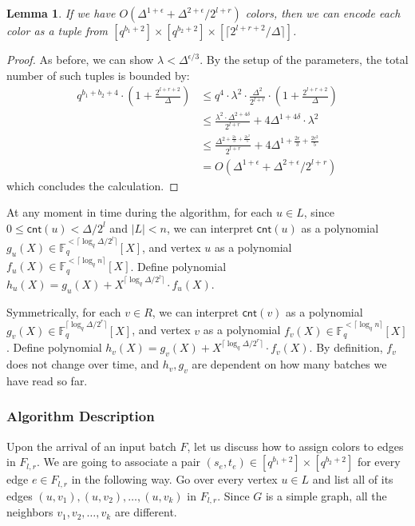 \documentclass[11pt,a4paper]{article}
\newtheorem{lemma}{Lemma}[section]
\newcommand{\ceil}[1]{\lceil #1 \rceil}
\newcommand{\cnt}{\mathsf{cnt}}
\newcommand{\brac}[1]{\left(#1\right)}
\newcommand{\field}{\mathbb{F}}
\begin{document}
\begin{lemma}
If we have $O\brac{\Delta^{1+\epsilon} + \Delta^{2+\epsilon} / 2^{l+r}}$ colors, then we can encode each color as a tuple from $[q^{b_1+2}]\times [q^{b_2+2}]\times [\ceil{2^{l+r+2} / \Delta}]$.
\end{lemma}
\begin{proof}
    As before, we can show $\lambda < \Delta^{\epsilon/3}$. By the setup of the parameters, the total number of such tuples is bounded by:
    $$\begin{aligned}
        q^{b_1+b_2+4}\cdot \brac{1 + \frac{2^{l+r+2}}{\Delta}}&\leq q^4\cdot \lambda^2\cdot \frac{\Delta^2}{2^{l+r}}\cdot \brac{1 + \frac{2^{l+r+2}}{\Delta}}\\
        &\leq \frac{\lambda^2\cdot\Delta^{2+4\delta}}{2^{l+r}} + 4\Delta^{1+4\delta}\cdot \lambda^2\\
        &\leq \frac{\Delta^{2 + \frac{2\epsilon}{3} + \frac{2\epsilon^2}{5}}}{2^{l+r}} + 4\Delta^{1 +  \frac{2\epsilon}{3} + \frac{2\epsilon^2}{5}}\\
        &= O(\Delta^{1+\epsilon} + \Delta^{2+\epsilon} / 2^{l+r})
    \end{aligned}$$
    which concludes the calculation.
\end{proof}

At any moment in time during the algorithm, for each $u\in L$, since $0\leq \cnt(u) < \Delta / 2^l$ and $|L| < n$, we can interpret $\cnt(u)$ as a polynomial $g_u(X)\in \field_q^{<\ceil{\log_q \Delta / 2^l}}[X]$, and vertex $u$ as a polynomial $f_u(X)\in \field_q^{<\ceil{\log_q n}}[X]$. Define polynomial $h_u(X) = g_u(X) + X^{\ceil{\log_q \Delta / 2^l}}\cdot f_u(X)$.

Symmetrically, for each $v\in R$, we can interpret $\cnt(v)$ as a polynomial $g_v(X)\in \field_q^{\ceil{\log_q \Delta / 2^r}}[X]$, and vertex $v$ as a polynomial $f_v(X)\in \field_q^{<\ceil{\log_q n}}[X]$. Define polynomial $h_v(X) = g_v(X) + X^{\ceil{\log_q \Delta / 2^r}}\cdot f_v(X)$. By definition, $f_v$ does not change over time, and $h_v, g_v$ are dependent on how many batches we have read so far.

\subsubsection{Algorithm Description}
Upon the arrival of an input batch $F$, let us discuss how to assign colors to edges in $F_{l, r}$. We are going to associate a pair $(s_e, t_e)\in [q^{b_1+2}]\times [q^{b_2+2}]$ for every edge $e\in F_{l, r}$ in the following way. Go over every vertex $u\in L$ and list all of its edges $(u, v_1), (u, v_2), \ldots, (u, v_k)$ in $F_{l, r}$. Since $G$ is a simple graph, all the neighbors $v_1, v_2, \ldots, v_k$ are different. 
\end{document}
